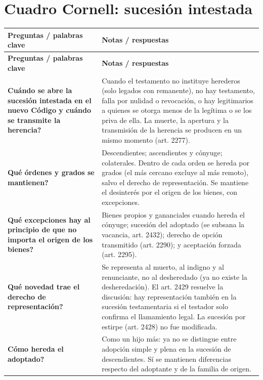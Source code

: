 \documentclass[12pt,oneside]{book}
\begin{document}
\section{Cuadro Cornell: sucesión intestada}

\begin{longtable}{
    >{\raggedright\arraybackslash}p{}
    >{\raggedright\arraybackslash}p{}
}
\toprule
\textbf{Preguntas / palabras clave} &
\textbf{Notas / respuestas} \\
\midrule
\endfirsthead
\toprule
\textbf{Preguntas / palabras clave} &
\textbf{Notas / respuestas} \\
\midrule
\endhead
\bottomrule
\endfoot

\textbf{\textquestiondown{}Cuándo se abre la sucesión intestada en el nuevo Código y cuándo se transmite la herencia?} &
Cuando el testamento no instituye herederos (solo legados con remanente), no hay testamento, falla por nulidad o revocación, o hay legitimarios a quienes se otorga menos de la legítima o se los priva de ella. La muerte, la apertura y la transmisión de la herencia se producen en un mismo momento (art. 2277). \\[0.6em]

\textbf{\textquestiondown{}Qué órdenes y grados se mantienen?} &
Descendientes; ascendientes y cónyuge; colaterales. Dentro de cada orden se hereda por grados (el más cercano excluye al más remoto), salvo el derecho de representación. Se mantiene el desinterés por el origen de los bienes, con excepciones. \\[0.6em]

\textbf{\textquestiondown{}Qué excepciones hay al principio de que no importa el origen de los bienes?} &
Bienes propios y gananciales cuando hereda el cónyuge; sucesión del adoptado (se subsana la vacancia, art. 2432); derecho de opción transmitido (art. 2290); y aceptación forzada (art. 2295). \\[0.6em]

\textbf{\textquestiondown{}Qué novedad trae el derecho de representación?} &
Se representa al muerto, al indigno y al renunciante, no al desheredado (ya no existe la desheredación). El art. 2429 resuelve la discusión: hay representación también en la sucesión testamentaria si el testador solo confirma el llamamiento legal. La sucesión por estirpe (art. 2428) no fue modificada. \\[0.6em]

\textbf{\textquestiondown{}Cómo hereda el adoptado?} &
Como un hijo más: ya no se distingue entre adopción simple y plena en la sucesión de descendientes. Sí se mantienen diferencias respecto del adoptante y de la familia de origen. \\[0.6em]


\end{longtable}
\end{document}

